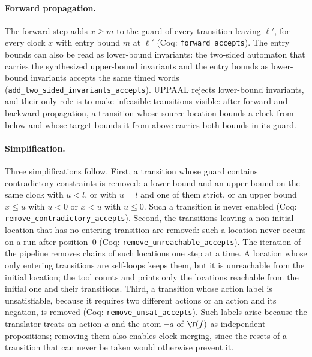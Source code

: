 \paragraph{Forward propagation.}
The forward step adds $x\ge m$ to the guard of every transition leaving
$\ell'$, for every clock $x$ with entry bound $m$ at $\ell'$ (Coq:
\texttt{forward\_\allowbreak{}accepts}).  The entry bounds can also be read as lower-bound
invariants: the two-sided automaton that carries the synthesized upper-bound
invariants and the entry bounds as lower-bound invariants accepts the same
timed words (\texttt{add\_\allowbreak{}two\_\allowbreak{}sided\_\allowbreak{}invariants\_\allowbreak{}accepts}).  UPPAAL
rejects lower-bound invariants, and their only role is to make infeasible
transitions visible: after forward and backward propagation, a transition whose
source location bounds a clock from below and whose target bounds it from above
carries both bounds in its guard.

\paragraph{Simplification.}
Three simplifications follow.  First, a transition whose guard contains
contradictory constraints is removed: a lower bound and an upper bound on the
same clock with $u<l$, or with $u=l$ and one of them strict, or an upper bound
$x\le u$ with $u<0$ or $x<u$ with $u\le0$.  Such a transition is never enabled (Coq:
\texttt{remove\_\allowbreak{}contradictory\_\allowbreak{}accepts}).  Second, the transitions
leaving a non-initial location that has no entering transition
are removed: such a location never occurs on a run after position~$0$ (Coq:
\texttt{remove\_\allowbreak{}unreachable\_\allowbreak{}accepts}).  The iteration of the pipeline
removes chains of such locations one step at a time.  A location whose only
entering transitions are self-loops keeps them, but it is unreachable from
the initial location; the tool counts and prints only the locations
reachable from the initial one and their transitions.  Third, a transition whose
action label is unsatisfiable, because it requires two different actions or an
action and its negation, is removed (Coq:
\texttt{remove\_\allowbreak{}unsat\_\allowbreak{}accepts}).  Such labels arise because the
translator treats an action $a$ and the atom $\neg a$ of $\T(f)$ as independent
propositions; removing them also enables clock merging, since the resets of a
transition that can never be taken would otherwise prevent it.

